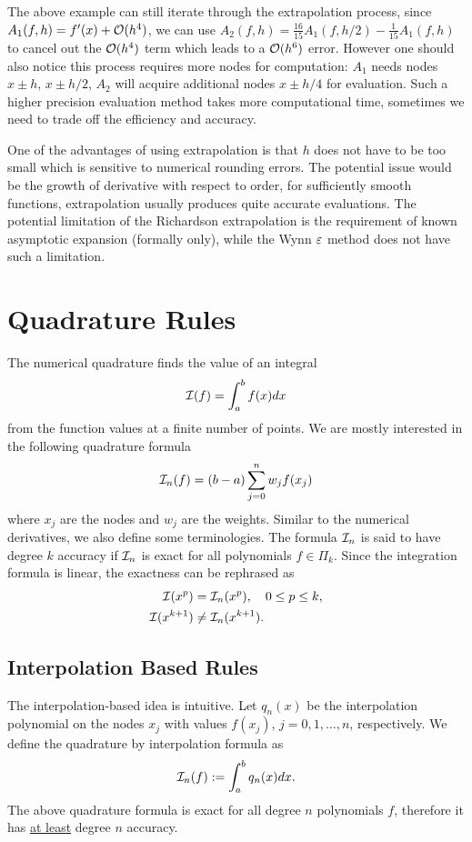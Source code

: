 The above example can still iterate through the extrapolation process, since $A_1(f, h) = f'(x) + \mathcal O(h^4)$, we can use $A_2(f, h) = \frac{16}{15}A_1(f, h/2) -  \frac{1}{15}A_1(f, h)$ to cancel out the $\mathcal O(h^4)$ term which leads to a $\mathcal O(h^6)$ error. However one should also notice this process requires more nodes for computation: $A_1$ needs nodes $x\pm h$, $x\pm h/2$, $A_2$ will acquire additional nodes $x\pm h/4$ for evaluation. Such a higher precision evaluation method takes more computational time, sometimes we need to trade off the efficiency and accuracy.

\begin{remark}
    One of the advantages of using extrapolation is that $h$ does not have to be too small which is sensitive to numerical rounding errors. The potential issue would be the growth of derivative with respect to order, for sufficiently smooth functions, extrapolation usually produces quite accurate evaluations. The potential limitation of the Richardson extrapolation is the requirement of known asymptotic expansion (formally only), while the Wynn $\varepsilon$ method does not have such a limitation. 
\end{remark}


\section{Quadrature Rules}
\label{Sec: 3-Qua-Rul}
The numerical quadrature finds the value of an integral 
$$\mathcal I(f) = \int_a^b f(x) dx $$
from the function values at a finite number of points. We are mostly interested in the following quadrature formula 
\begin{equation}
    \mathcal I_n(f) = (b - a) \sum_{j=0}^n w_j f(x_j)
\end{equation}
where $x_j$ are the nodes and $w_j$ are the weights. Similar to the numerical derivatives, we also define some terminologies. The formula $\mathcal I_n$ is said to have degree $k$ accuracy if $\mathcal I_n$ is exact for all polynomials $f\in\Pi_k$. Since the integration formula is linear, the exactness can be rephrased as 
\begin{equation}
    \begin{aligned}
        \mathcal I(x^p) &= \mathcal I_n(x^p),\quad 0\le p \le k, \\
        \mathcal I(x^{k+1}) &\neq \mathcal I_n(x^{k+1}) .   
    \end{aligned}
\end{equation}

\subsection{Interpolation Based Rules}
\label{SSec: 3-Int-Bas-Rul}
The interpolation-based idea is intuitive. Let $q_n(x)$ be the interpolation polynomial on the nodes $x_j$ with values $f(x_j)$, $j=0,1,\dots, n$, respectively. We define the quadrature by interpolation formula as 
\begin{equation}
    \mathcal I_n(f):= \int_a^b q_n(x) dx.
\end{equation}
The above quadrature formula is exact for all degree $n$ polynomials $f$, therefore it has \underline{at least} degree $n$ accuracy. 

